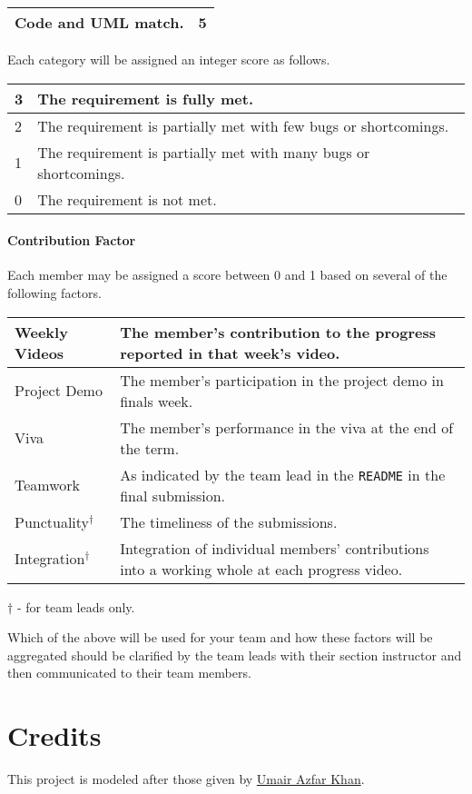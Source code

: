 \documentclass[addpoints]{exam}
\begin{document}
\begin{questions}
\begin{tabularx}{\textwidth}{|p{}|R|}
Code and UML match. & 5    \\\hline
\end{tabularx}
Each category will be assigned an integer score as follows.\\
\begin{tabular}{|l|l|}
  \hline
  3 & The requirement is fully met.\\\hline
  2 & The requirement is partially met with few bugs or shortcomings.\\\hline
  1 & The requirement is partially met with many bugs or shortcomings.\\\hline
  0 & The requirement is not met.\\\hline
\end{tabular}

\paragraph{Contribution Factor} Each member may be assigned a score between 0 and 1 based on several of the following factors. \\
\begin{tabularx}{\textwidth}{|l|X|}
  \hline
  Weekly Videos & The member's contribution to the progress reported in that week's video.\\\hline
  Project Demo & The member's participation in the project demo in finals week.\\\hline
  Viva & The member's performance in the viva at the end of the term.\\\hline
  Teamwork & As indicated by the team lead in the \texttt{README} in the final submission.\\\hline
  Punctuality$^\dagger$ & The timeliness of the submissions.\\\hline
  Integration$^\dagger$ & Integration of individual members' contributions into a working whole at each progress video.\\\hline
\end{tabularx}
$\dagger$ - for team leads only.

Which of the above will be used for your team and how these factors will be aggregated should be clarified by the team leads with their section instructor and then communicated to their team members.


\section*{Credits}
This project is modeled after those given by \href{https://habib.edu.pk/SSE/dr-umair-azfar-khan/}{Umair Azfar Khan}.

\end{questions}
\end{document}
